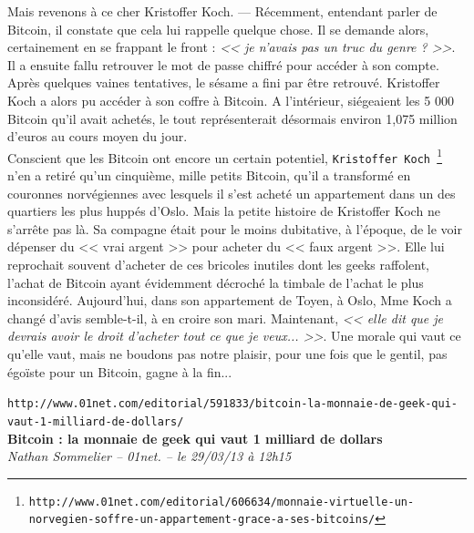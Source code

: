 \documentclass[11pt,twoside,a4paper]{article}
\begin{document}
Mais revenons {\`a} ce cher Kristoffer Koch. --- R{\'e}cemment, entendant parler de Bitcoin, il constate que cela lui rappelle quelque chose. Il se demande alors, certainement en se frappant le front : \emph{<< je n'avais pas un truc du genre ? >>}. Il a ensuite fallu retrouver le mot de passe chiffr{\'e} pour acc{\'e}der {\`a} son compte. Apr{\`e}s quelques vaines tentatives, le s{\'e}same a fini par {\^e}tre retrouv{\'e}. Kristoffer Koch a alors pu acc{\'e}der {\`a} son coffre {\`a} Bitcoin. A l'int{\'e}rieur, si{\'e}geaient les 5 000 Bitcoin qu'il avait achet{\'e}s, le tout repr{\'e}senterait d{\'e}sormais environ 1,075 million d'euros au cours moyen du jour. ~\\

Conscient que les Bitcoin ont encore un certain potentiel, \texttt{Kristoffer Koch~\footnote{\texttt{http://www.01net.com/editorial/606634/monnaie-virtuelle-un-norvegien-soffre-un-appartement-grace-a-ses-bitcoins/}}} n'en a retir{\'e} qu'un cinqui{\`e}me, mille petits Bitcoin, qu'il a transform{\'e} en couronnes norv{\'e}giennes avec lesquels il s'est achet{\'e} un appartement dans un des quartiers les plus hupp{\'e}s d'Oslo. Mais la petite histoire de Kristoffer Koch ne s'arr{\^e}te pas l{\`a}. Sa compagne {\'e}tait pour le moins dubitative, {\`a} l'{\'e}poque, de le voir d{\'e}penser du << vrai argent >> pour acheter du << faux argent >>. Elle lui reprochait souvent d'acheter de ces bricoles inutiles dont les geeks raffolent, l'achat de Bitcoin ayant {\'e}videmment d{\'e}croch{\'e} la timbale de l'achat le plus inconsid{\'e}r{\'e}. Aujourd'hui, dans son appartement de Toyen, {\`a} Oslo, Mme Koch a chang{\'e} d'avis semble-t-il, {\`a} en croire son mari. Maintenant, \emph{<< elle dit que je devrais avoir le droit d'acheter tout ce que je veux... >>}. Une morale qui vaut ce qu'elle vaut, mais ne boudons pas notre plaisir, pour une fois que le gentil, pas {\'e}go{\"i}ste pour un Bitcoin, gagne {\`a} la fin...

\clearpage

\texttt{http://www.01net.com/editorial/591833/bitcoin-la-monnaie-de-geek-qui-vaut-1-milliard-de-dollars/}~\\

\textbf{Bitcoin : la monnaie de geek qui vaut 1 milliard de dollars}~\\

\emph{\small Nathan Sommelier -- 01net. -- le 29/03/13 {\`a} 12h15 }~\\
\end{document}
